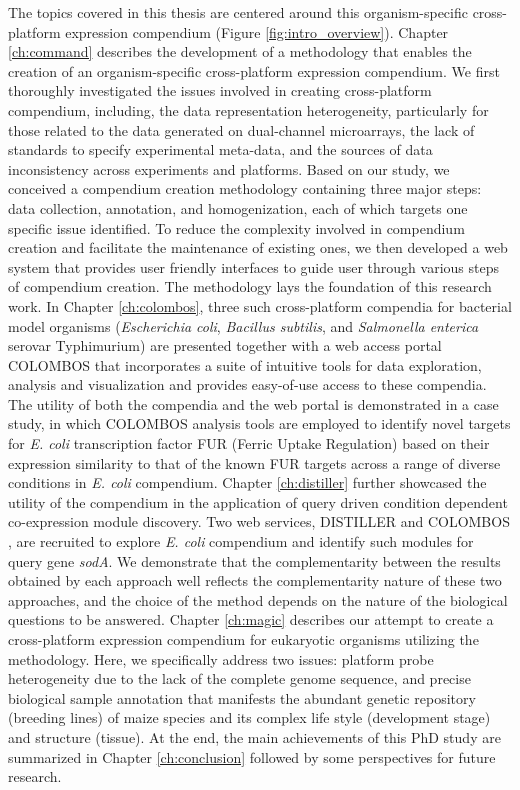 The topics covered in this thesis are centered around this organism-specific cross-platform expression compendium (Figure \ref{fig:intro_overview}).  Chapter \ref{ch:command} describes the development of a methodology that enables the creation of an organism-specific cross-platform expression compendium. We first thoroughly investigated the issues involved in creating cross-platform compendium, including, the data representation heterogeneity, particularly for those related to the data generated on dual-channel microarrays, the lack of standards to specify experimental meta-data, and the sources of data inconsistency across experiments and platforms. Based on our study, we conceived a compendium creation methodology containing three major steps: data collection, annotation, and homogenization, each of which targets one specific issue identified. To reduce the complexity involved in compendium creation and facilitate the maintenance of existing ones, we then developed a web system that provides user friendly interfaces to guide user through various steps of compendium creation. The methodology lays the foundation of this research work. In Chapter \ref{ch:colombos}, three such cross-platform compendia for bacterial model organisms (\textit{Escherichia coli}, \textit{Bacillus   subtilis}, and \textit{Salmonella enterica} serovar Typhimurium) are presented together with a web access portal COLOMBOS that incorporates a suite of intuitive tools for data exploration, analysis and visualization and provides easy-of-use access to these compendia. The utility of both the compendia and the web portal is demonstrated in a case study, in which COLOMBOS analysis tools are employed to identify novel targets for \textit{E. coli} transcription factor FUR (Ferric Uptake Regulation) based on their expression similarity to that of the known FUR targets across a range of diverse conditions in \textit{E. coli} compendium. Chapter \ref{ch:distiller} further showcased the utility of the compendium in the application of query driven condition dependent co-expression module discovery. Two web services, DISTILLER \cite{Lemmens2009} and COLOMBOS \cite{Engelen2011}, are recruited to explore \textit{E. coli} compendium and identify such modules for query gene \textit{sodA}. We demonstrate that the complementarity between the results obtained by each approach well reflects the complementarity nature of these two approaches, and the choice of the method depends on the nature of the biological questions to be answered. Chapter \ref{ch:magic} describes our attempt to create a cross-platform expression compendium for eukaryotic organisms utilizing the methodology. Here, we specifically address two issues: platform probe heterogeneity due to the lack of the complete genome sequence, and precise biological sample annotation that manifests the abundant genetic repository (breeding lines) of maize species and its complex life style (development stage) and structure (tissue). At the end, the main achievements of this PhD study are summarized in Chapter \ref{ch:conclusion} followed by some perspectives for future research.










